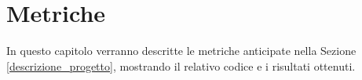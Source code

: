 \chapter{Metriche}
In questo capitolo verranno descritte le metriche anticipate nella Sezione \ref{descrizione_progetto}, mostrando il relativo codice e i risultati ottenuti.

